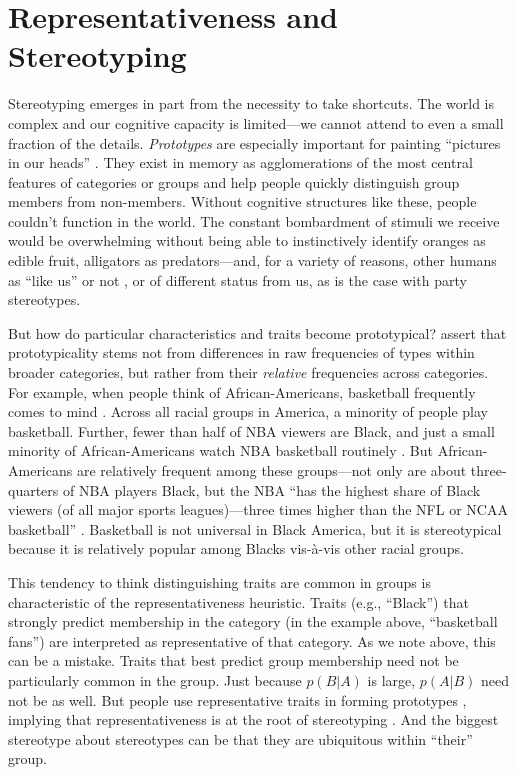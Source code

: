 \documentclass[12pt, letterpaper]{article}
\begin{document}
\section{Representativeness and Stereotyping}

Stereotyping emerges in part from the necessity to take shortcuts. The world is complex and our cognitive capacity is limited---we cannot attend to even a small fraction of the details. \emph{Prototypes} are especially important for painting ``pictures in our heads'' \citep{Lippmann1922}. They exist in memory as agglomerations of the most central features of categories or groups \citep{RoschMervis1975} and help people quickly distinguish group members from non-members. Without cognitive structures like these, people couldn't function in the world. The constant bombardment of stimuli we receive would be overwhelming without being able to instinctively identify oranges as edible fruit, alligators as predators---and, for a variety of reasons, other humans as ``like us'' or not \citep{kinder2010us}, or of different status from us, as is the case with party stereotypes.

But how do particular characteristics and traits become prototypical? \citet{RoschMervis1975} assert that prototypicality stems not from differences in raw frequencies of types within broader categories, but rather from their \emph{relative} frequencies across categories. For example, when people think of African-Americans, basketball frequently comes to mind \citep{eberhardt2004seeing}. %
Across all racial groups in America, a minority of people play basketball. Further, fewer than half of NBA viewers are Black, and just a small minority of African-Americans watch NBA basketball routinely \citep{thompson2014which}. But African-Americans are relatively frequent among these groups---not only are about three-quarters of NBA players Black, but the NBA ``has the highest share of Black viewers (of all major sports leagues)---three times higher than the NFL or NCAA basketball'' \citep{thompson2014which}. Basketball is not universal in Black America, but it is stereotypical because it is relatively popular among Blacks vis-\`{a}-vis other racial groups.

This tendency to think distinguishing traits are common in groups is characteristic of the representativeness heuristic. Traits (e.g., ``Black'') that strongly predict membership in the category (in the example above, ``basketball fans'') are interpreted as representative of that category. As we note above, this can be a mistake. Traits that best predict group membership need not be particularly common in the group. Just because $p(B | A)$ is large, $p(A | B)$ need not be as well. But people use representative traits in forming prototypes \citep{RoschMervis1975}, implying that representativeness is at the root of stereotyping \citep{bordalo2016stereotypes}. And the biggest stereotype about stereotypes can be that they are ubiquitous within ``their'' group.
\end{document}
